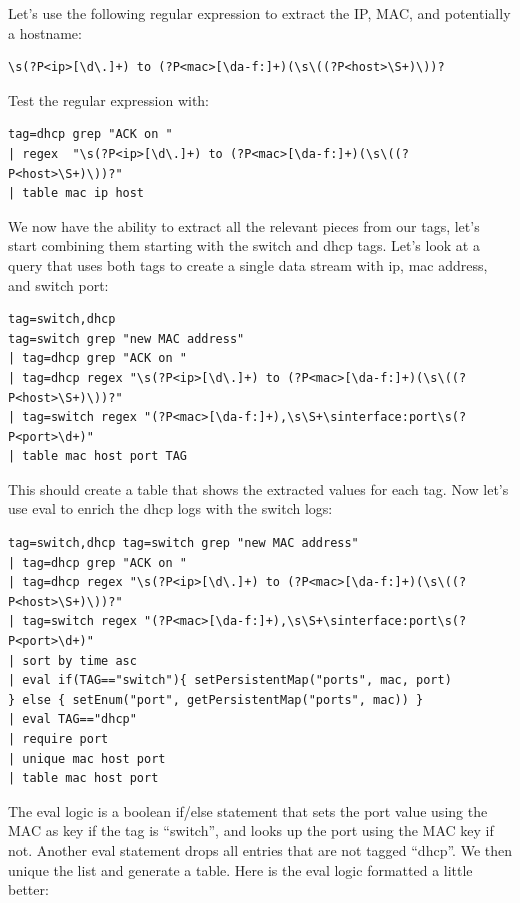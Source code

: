 Let's use the following regular expression to extract the IP, MAC, and
potentially a hostname:

\begin{Verbatim}[breaklines=true]
\s(?P<ip>[\d\.]+) to (?P<mac>[\da-f:]+)(\s\((?P<host>\S+)\))?
\end{Verbatim}


Test the regular expression with:

\begin{Verbatim}[breaklines=true]
tag=dhcp grep "ACK on " 
| regex  "\s(?P<ip>[\d\.]+) to (?P<mac>[\da-f:]+)(\s\((?P<host>\S+)\))?"
| table mac ip host
\end{Verbatim}

We now have the ability to extract all the relevant pieces from our
tags, let's start combining them starting with the switch and
dhcp tags. Let's look at a query that uses both tags to create a
single data stream with ip, mac address, and switch port:

\begin{Verbatim}[breaklines=true]
tag=switch,dhcp
tag=switch grep "new MAC address" 
| tag=dhcp grep "ACK on " 
| tag=dhcp regex "\s(?P<ip>[\d\.]+) to (?P<mac>[\da-f:]+)(\s\((?P<host>\S+)\))?"
| tag=switch regex "(?P<mac>[\da-f:]+),\s\S+\sinterface:port\s(?P<port>\d+)"
| table mac host port TAG
\end{Verbatim}

This should create a table that shows the extracted values for each
tag. Now let's use eval to enrich the dhcp logs with the switch logs:

\begin{Verbatim}[breaklines=true]
tag=switch,dhcp tag=switch grep "new MAC address"
| tag=dhcp grep "ACK on "
| tag=dhcp regex "\s(?P<ip>[\d\.]+) to (?P<mac>[\da-f:]+)(\s\((?P<host>\S+)\))?"
| tag=switch regex "(?P<mac>[\da-f:]+),\s\S+\sinterface:port\s(?P<port>\d+)"
| sort by time asc
| eval if(TAG=="switch"){ setPersistentMap("ports", mac, port)
} else { setEnum("port", getPersistentMap("ports", mac)) }
| eval TAG=="dhcp" 
| require port 
| unique mac host port 
| table mac host port
\end{Verbatim}

The eval logic is a boolean if/else statement that sets the port value
using the MAC as key if the tag is ``switch'', and looks up the port using the
MAC key if not. Another eval statement drops all entries that are not
tagged ``dhcp''. We then unique the list and generate a table. Here is the eval
logic formatted a little better:

